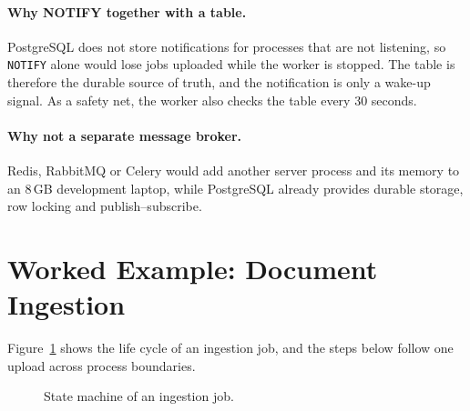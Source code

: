 \documentclass[11pt,a4paper,oneside]{report}
\begin{document}
\paragraph{Why NOTIFY together with a table.} PostgreSQL does not store notifications for
processes that are not listening, so \texttt{NOTIFY} alone would lose jobs uploaded while
the worker is stopped. The table is therefore the durable source of truth, and the
notification is only a wake-up signal. As a safety net, the worker also checks the table
every 30 seconds.

\paragraph{Why not a separate message broker.} Redis, RabbitMQ or Celery would add another
server process and its memory to an 8\,GB development laptop, while PostgreSQL already
provides durable storage, row locking and publish--subscribe.

\section{Worked Example: Document Ingestion}
Figure~\ref{fig:jobs} shows the life cycle of an ingestion job, and the steps below follow
one upload across process boundaries.

\begin{figure}[H]
\centering
\resizebox{0.85\textwidth}{!}{}
\caption{State machine of an ingestion job.}
\label{fig:jobs}
\end{figure}
\end{document}

